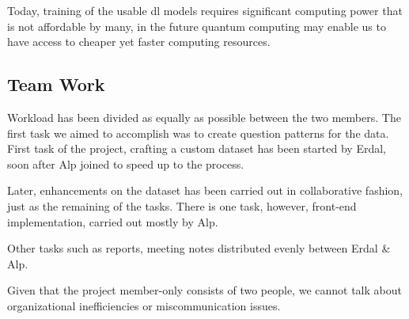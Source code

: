 \documentclass{mefsdp}
\begin{document}
	Today, training of the usable \gls{dl} models requires significant computing power that is not affordable by many, in the future quantum computing may enable us to have access to cheaper yet faster computing resources. \newline \par
	
	\subsection{Team Work}
	Workload has been divided as equally as possible between the two members. The first task we aimed to accomplish was to create question patterns for the data. First task of the project, crafting a custom dataset has been started by Erdal, soon after Alp joined to speed up to the process. \newline \par 
	
	Later, enhancements on the dataset has been carried out in collaborative fashion, just as the remaining of the tasks. There is one task, however, front-end implementation, carried out mostly by Alp.  
	
	Other tasks such as reports, meeting notes distributed evenly between Erdal \& Alp.\newline \par
	
	Given that the project member-only consists of two people, we cannot talk about organizational inefficiencies or miscommunication issues. 
	
	\begin{appendix}
	\end{appendix}
\end{document}
